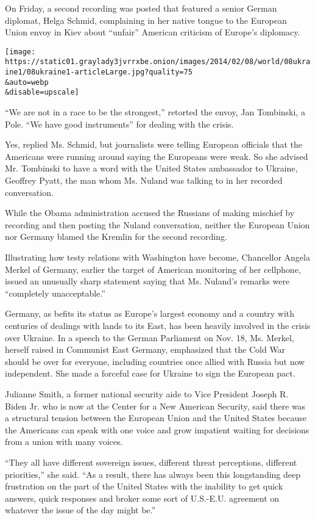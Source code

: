 On Friday, a second recording was posted that featured a senior German
diplomat, Helga Schmid, complaining in her native tongue to the European
Union envoy in Kiev about ``unfair'' American criticism of Europe's
diplomacy.

\texttt{[image: https://static01.graylady3jvrrxbe.onion/images/2014/02/08/world/08ukraine1/08ukraine1-articleLarge.jpg?quality=75\\\&auto=webp\\\&disable=upscale]}

``We are not in a race to be the strongest,'' retorted the envoy, Jan
Tombinski, a Pole. ``We have good instruments'' for dealing with the
crisis.

Yes, replied Ms. Schmid, but journalists were telling European officials
that the Americans were running around saying the Europeans were weak.
So she advised Mr. Tombinski to have a word with the United States
ambassador to Ukraine, Geoffrey Pyatt, the man whom Ms. Nuland was
talking to in her recorded conversation.

While the Obama administration accused the Russians of making mischief
by recording and then posting the Nuland conversation, neither the
European Union nor Germany blamed the Kremlin for the second recording.

Illustrating how testy relations with Washington have become, Chancellor
Angela Merkel of Germany, earlier the target of American monitoring of
her cellphone, issued an unusually sharp statement saying that Ms.
Nuland's remarks were ``completely unacceptable.''

Germany, as befits its status as Europe's largest economy and a country
with centuries of dealings with lands to its East, has been heavily
involved in the crisis over Ukraine. In a speech to the German
Parliament on Nov. 18, Ms. Merkel, herself raised in Communist East
Germany, emphasized that the Cold War should be over for everyone,
including countries once allied with Russia but now independent. She
made a forceful case for Ukraine to sign the European pact.

Julianne Smith, a former national security aide to Vice President Joseph
R. Biden Jr. who is now at the Center for a New American Security, said
there was a structural tension between the European Union and the United
States because the Americans can speak with one voice and grow impatient
waiting for decisions from a union with many voices.

``They all have different sovereign issues, different threat
perceptions, different priorities,'' she said. ``As a result, there has
always been this longstanding deep frustration on the part of the United
States with the inability to get quick answers, quick responses and
broker some sort of U.S.-E.U. agreement on whatever the issue of the day
might be.''

